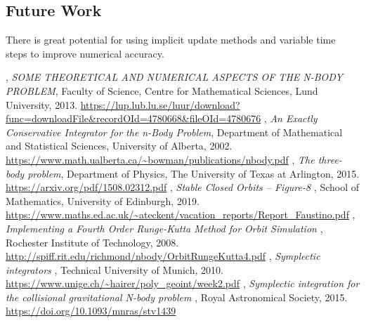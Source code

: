 \documentclass[a4paper,11pt]{article}
\begin{document}
\subsection{Future Work}

There is great potential for using implicit update methods and variable time steps to improve numerical accuracy.

\begin{thebibliography}{10}
, {\em SOME THEORETICAL AND NUMERICAL ASPECTS OF THE N-BODY PROBLEM}, Faculty of Science, Centre for Mathematical Sciences, Lund University, 2013. \url{https://lup.lub.lu.se/luur/download?func=downloadFile&recordOId=4780668&fileOId=4780676}
, {\em An Exactly Conservative Integrator for the n-Body Problem}, Department of Mathematical and Statistical Sciences, University of Alberta, 2002. \url{https://www.math.ualberta.ca/~bowman/publications/nbody.pdf}
, {\em The three-body problem}, Department of Physics, The University of Texas at Arlington, 2015. \url{https://arxiv.org/pdf/1508.02312.pdf}
, {\em Stable Closed Orbits – Figure-8
}, School of Mathematics, University of Edinburgh, 2019. \url{https://www.maths.ed.ac.uk/~ateckent/vacation_reports/Report_Faustino.pdf}
, {\em Implementing a Fourth Order Runge-Kutta Method for Orbit Simulation
}, Rochester Institute of Technology, 2008. \url{http://spiff.rit.edu/richmond/nbody/OrbitRungeKutta4.pdf}
, {\em Symplectic integrators
}, Technical University of Munich, 2010. \url{https://www.unige.ch/~hairer/poly_geoint/week2.pdf}
, {\em Symplectic integration for the collisional gravitational N-body problem
}, Royal Astronomical Society, 2015. \url{https://doi.org/10.1093/mnras/stv1439}
\end{thebibliography}
\end{document}
